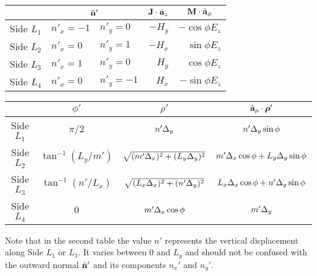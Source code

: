 \begin{center}
\begin{tabular}{c|l|l|r|r}
   & \multicolumn{2}{c|}{$\hat{\mathbf{n}}'$}
   & $\mathbf{J}\cdot\hat{\mathbf{a}}_{z}$  
   & \multicolumn{1}{c}{$\mathbf{M}\cdot\hat{\mathbf{a}}_{\phi}$}
\\ \hline
Side $L_1$ \rule[-7pt]{0pt}{20pt}
   & $n'_x=-1$ & $n'_y=0$
   & $-H_y$
   & $-\cos\phi E_z$
 \\\hline
Side $L_2$ \rule[-7pt]{0pt}{20pt}
   & $n'_x=0$ & $n'_y=1$
   & $-H_x$
   & $\sin\phi E_z$
\\\hline
Side $L_3$ \rule[-7pt]{0pt}{20pt}
   & $n'_x=1$ & $n'_y=0$ 
   & $H_y$
   & $\cos\phi E_z$
\\\hline
Side $L_4$ \rule[-7pt]{0pt}{20pt}
   & $n'_x=0$ & $n'_y=-1$
   & $H_x$
   & $-\sin\phi E_z$ 
\end{tabular}
\end{center}

\begin{center}
\begin{tabular}{c|c|c|c}
   & $\phi'$  & $\rho'$ & $\hat{\mathbf{a}}_{\rho}\cdot\boldsymbol{\rho}'$
\\ \hline
Side $L_1$ \rule[-7pt]{0pt}{20pt}
   & $\pi/2$
   & $n'\Delta_y$
   & $n'  \Delta_y \sin\phi$
\\\hline
Side $L_2$ \rule[-7pt]{0pt}{20pt}
   & $\tan^{-1}(L_y/m')$
   & $\sqrt{(m'\Delta_x)^2+(L_y\Delta_y)^2}$
   & $m'  \Delta_x \cos\phi + L_y \Delta_y \sin\phi$
\\\hline
Side $L_3$ \rule[-7pt]{0pt}{20pt}
   & $\tan^{-1}(n'/L_x)$
   & $\sqrt{(L_x\Delta_x)^2+(n'\Delta_y)^2}$
   & $L_x \Delta_x \cos\phi + n'  \Delta_y \sin\phi$
\\\hline
Side $L_4$ \rule[-7pt]{0pt}{20pt}
   & $0$ 
   & $m' \Delta_x \cos\phi$
   & $m'\Delta_y$
\end{tabular}
\end{center}
Note that in the second table the value $n'$ represents the
vertical displacement along Side $L_1$ or $L_3$.  It varies between
$0$ and $L_y$ and should not be confused with the outward normal
$\hat{\mathbf{n}}'$ and its components $n_x'$ and $n_y'$.

